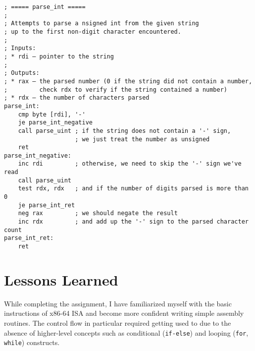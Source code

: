 \documentclass[12pt,a4paper]{report}
\begin{document}
\begin{lstlisting}[basicstyle=\scriptsize]
; ===== parse_int =====
;
; Attempts to parse a nsigned int from the given string
; up to the first non-digit character encountered.
;
; Inputs:
; * rdi — pointer to the string
;
; Outputs:
; * rax — the parsed number (0 if the string did not contain a number,
;         check rdx to verify if the string contained a number)
; * rdx — the number of characters parsed
parse_int:
    cmp byte [rdi], '-'
    je parse_int_negative
    call parse_uint ; if the string does not contain a '-' sign,
                    ; we just treat the number as unsigned
    ret
parse_int_negative:
    inc rdi         ; otherwise, we need to skip the '-' sign we've read
    call parse_uint
    test rdx, rdx   ; and if the number of digits parsed is more than 0
    je parse_int_ret
    neg rax         ; we should negate the result
    inc rdx         ; and add up the '-' sign to the parsed character count
parse_int_ret:
    ret
\end{lstlisting}

\section*{Lessons Learned}

While completing the assignment, I have familiarized myself with the basic instructions of x86-64 ISA and become more confident writing simple assembly routines. The control flow in particular required getting used to due to the absence of higher-level concepts such as conditional (\texttt{if-else}) and looping (\texttt{for}, \texttt{while}) constructs.
\end{document}
